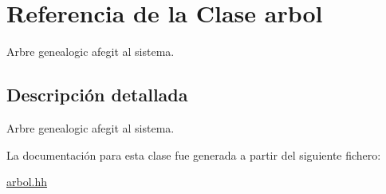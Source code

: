 \hypertarget{classarbol}{}\section{Referencia de la Clase arbol}
\label{classarbol}


Arbre genealogic afegit al sistema.  




\subsection{Descripción detallada}
Arbre genealogic afegit al sistema. 

La documentación para esta clase fue generada a partir del siguiente fichero\+:\begin{DoxyCompactItemize}
\item 
\hyperlink{arbol_8hh}{arbol.\+hh}\end{DoxyCompactItemize}
